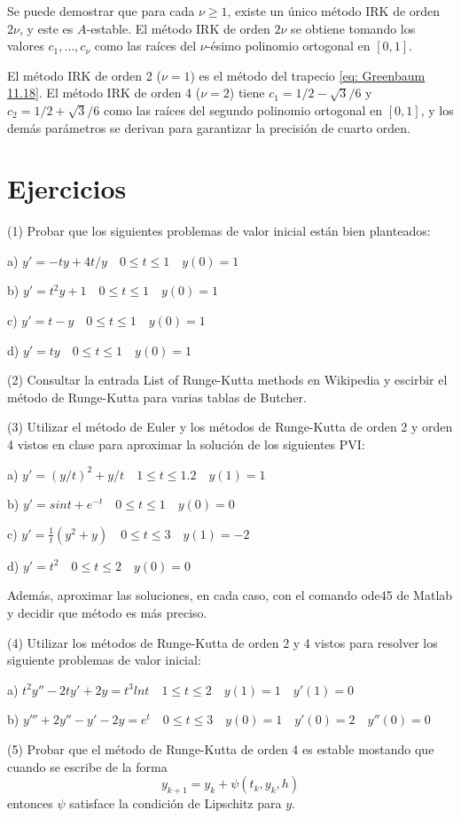 Se puede demostrar que para cada \( \nu \geq 1 \), existe un único método IRK de orden \( 2\nu \), y este es \( A \)-estable. El método IRK de orden \( 2\nu \) se obtiene tomando los valores \( c_1, \dots, c_\nu \) como las raíces del \( \nu \)-ésimo polinomio ortogonal en \([0, 1]\). 

El método IRK de orden 2 (\( \nu = 1 \)) es el método del trapecio \ref{eq: Greenbaum 11.18}. El método IRK de orden 4 (\( \nu = 2 \)) tiene \( c_1 = 1/2 - \sqrt{3} / 6\) y \( c_2 = 1/2 + \sqrt{3} / 6\) como las raíces del segundo polinomio ortogonal en \([0, 1]\), y los demás parámetros se derivan para garantizar la precisión de cuarto orden.

\section*{Ejercicios}
\noindent (1) Probar que los siguientes problemas de valor inicial están bien planteados:

a) $y' = -ty + 4t/y \quad 0 \leq t \leq 1 \quad y(0) = 1$

b) $y' = t^2 y + 1 \quad 0 \leq t \leq 1 \quad y(0) = 1$

c) $y' = t - y \quad 0 \leq t \leq 1 \quad y(0) = 1$

d) $y' = ty \quad 0 \leq t \leq 1 \quad y(0) = 1$

\noindent (2) Consultar la entrada List of Runge-Kutta methods en Wikipedia y escirbir el método de Runge-Kutta para varias tablas de Butcher.

\noindent (3) Utilizar el método de Euler y los métodos de Runge-Kutta de orden 2 y orden 4 vistos en clase para aproximar la solución de los siguientes PVI:

a) $y' = (y/t)^2 + y/t \quad 1 \leq t \leq 1.2 \quad y(1) = 1$

b) $y' = sin t + e^{-t} \quad 0 \leq t \leq 1 \quad y(0) = 0$

c) $y' = \frac{1}{t} (y^2 + y) \quad 0 \leq t \leq 3 \quad y(1) = -2$

d) $y' = t^2 \quad 0 \leq t \leq 2 \quad y(0) = 0$

Además, aproximar las soluciones, en cada caso, con el comando ode45 de Matlab y decidir que método es más preciso.

\noindent (4) Utilizar los métodos de Runge-Kutta de orden 2 y 4 vistos para resolver los siguiente problemas de valor inicial:

a) $t^2 y'' - 2 t y' + 2y = t^3 lnt \quad 1 \leq t \leq 2 \quad y(1) = 1 \quad y'(1) = 0$

b) $y''' + 2 y'' - y ' - 2y = e^t \quad 0 \leq t \leq 3 \quad y(0) = 1 \quad y'(0) = 2 \quad y''(0) = 0$

\noindent (5) Probar que el método de Runge-Kutta de orden 4 es estable mostando que cuando se escribe de la forma 
\[ y_{k + 1} = y_k + \psi (t_k, y_k, h) \]
entonces $\psi$ satisface la condición de Lipschitz para $y$.